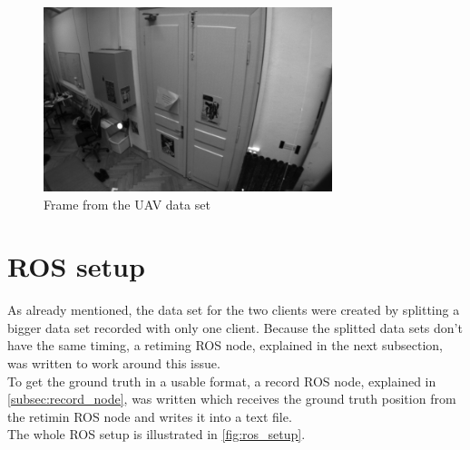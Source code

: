 \begin{figure}[H]
  \centering
  \includegraphics[width=0.75\textwidth]{images/frame0128}
  \caption{Frame from the \ac{UAV} data set}
  \label{fig:dataset_uav}
\end{figure}

\section{\acf{ROS} setup}
As already mentioned, the data set for the two clients were created by splitting a bigger data set recorded with only one client. Because the splitted data sets don't have the same timing, a retiming \ac{ROS} node, explained in the next subsection, was written to work around this issue.\\
To get the ground truth in a usable format, a record \ac{ROS} node, explained in \autoref{subsec:record_node}, was written which receives the ground truth position from the retimin \ac{ROS} node and writes it into a text file.\\

The whole \ac{ROS} setup is illustrated in \autoref{fig:ros_setup}.

